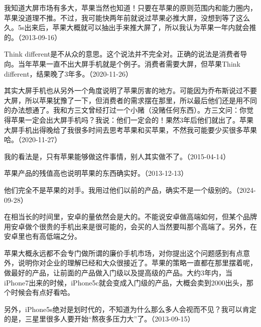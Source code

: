 
我知道大屏市场有多大，苹果当然也知道！只要在苹果的原则范围内和能力圈内，苹果没道理不推。不过，我可能快两年前就说过苹果必推大屏，没想到等了这么久。5s出来后，苹果大概就可以抽出手来推大屏了，所以我认为苹果一年内就会推的。（2013-09-16）


Think different是不从众的意思。这个说法并不完全对。正确的说法是消费者导向。当年苹果一直不出大屏手机就是个例子。消费者需要大屏，但苹果Think different，结果晚了3年多。（2020-11-26）

其实大屏手机也从另外一个角度说明了苹果厉害的地方。可能因为乔布斯说过不要大屏，所以苹果犹豫了一下，但消费者的需求摆在那里，所以最后他们还是用不同的办法想通了。我和方三文曾经打过一个小赌（没赌任何东西）。方三文问：你觉得苹果一定会出大屏手机吗？我说：他们一定会的！果然3年后他们就出了。苹果大屏手机出得晚给了我很多时间去思考苹果和买苹果，不然我可能要少买很多苹果哈。（2020-11-27）


我的看法是，只有苹果能够做这件事情，别人其实做不了。（2015-04-14）

苹果产品的残值高也说明苹果的东西确实好。（2013-12-13）


他们完全不是苹果的对手。我用过他们以前的产品，确实不是一个级别的。（2024-09-28）


在相当长的时间里，安卓的量依然会是大的。不能说安卓做高端如何，但某个品牌用安卓做个很贵的手机出来是很可能的，会买的人当然要叫那个高端了。另外，在安卓里也有高低端之分。

苹果大概永远都不会专门做所谓的廉价手机市场，对你提出这个问题感到有点意外，说明你对企业的理解已经和大众很接近了。苹果的策略一直都在那里摆着呢，做最好的产品，让前面的产品做入门级以及提高级的产品。大约3年内，当iPhone7出来的时候，iPhone5c就会变成入门级的产品，大概会卖到2000出头，那个时候会有点好看哈。

另外，iPhone5s绝对是划时代的，不知道为什么那么多人会视而不见？我可以肯定的是，三星里很多人要开始“熬夜多压力大”了。（2013-09-15）

